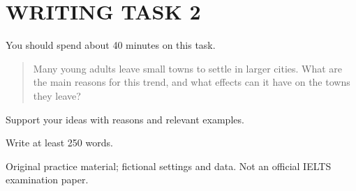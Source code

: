 \section*{WRITING TASK 2}
You should spend about 40 minutes on this task.

\begin{quote}\large Many young adults leave small towns to settle in larger cities. What are the main reasons for this trend, and what effects can it have on the towns they leave?
\end{quote}
Support your ideas with reasons and relevant examples.

Write at least 250 words.
\par\bigskip
{\footnotesize\color{gray} Original practice material; fictional settings and data. Not an official IELTS examination paper.}
